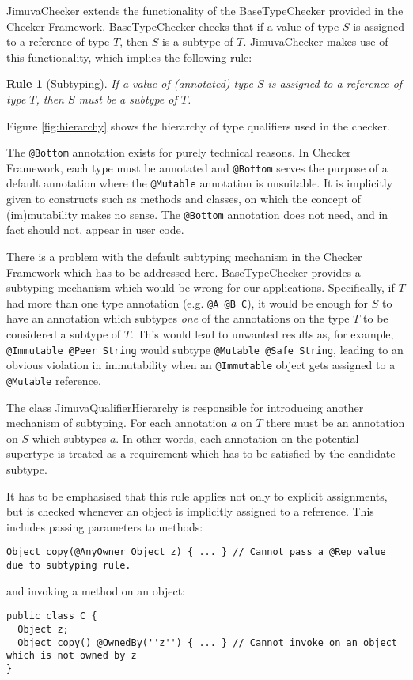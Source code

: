 \documentclass{pracamgr}
\theoremstyle{all}
\newtheorem{verrule}{Rule}
\begin{document}
JimuvaChecker extends the functionality of the BaseTypeChecker
provided in the Checker Framework. BaseTypeChecker checks that if a
value of type $S$ is assigned to a reference of type $T$, then $S$ is
a subtype of $T$. JimuvaChecker makes use of this functionality, which
implies the following rule:

\setcounter{verrule}{-1}
\begin{verrule}[Subtyping]
  If a value of (annotated) type $S$ is assigned to a reference of type $T$, 
  then $S$ must be a subtype of $T$.
\end{verrule}
Figure \ref{fig:hierarchy} shows the hierarchy of type qualifiers used
in the checker. 

The \texttt{@Bottom} annotation exists for purely technical
reasons. In Checker Framework, each type must be annotated and
\texttt{@Bottom} serves the purpose of a default annotation where the
\texttt{@Mutable} annotation is unsuitable. It is implicitly given to
constructs such as methods and classes, on which the concept of
(im)mutability makes no sense. The \texttt{@Bottom} annotation does
not need, and in fact should not, appear in user code. 

There is a problem with the default subtyping mechanism in the Checker
Framework which has to be addressed here. BaseTypeChecker provides a
subtyping mechanism which would be wrong for our
applications. Specifically, if $T$ had more than one type annotation
(e.g. \texttt{@A @B C}), it would be enough for $S$ to have an
annotation which subtypes \emph{one} of the annotations on the type
$T$ to be considered a subtype of $T$. This would lead to unwanted
results as, for example, \texttt{@Immutable @Peer String} would
subtype \texttt{@Mutable @Safe String}, leading to an obvious
violation in immutability when an \texttt{@Immutable} object gets
assigned to a \texttt{@Mutable} reference. 

The class JimuvaQualifierHierarchy is responsible for introducing
another mechanism of subtyping. For each annotation $a$ on $T$ there
must be an annotation on $S$ which subtypes $a$. In other words, each
annotation on the potential supertype is treated as a requirement
which has to be satisfied by the candidate subtype. 

It has to be emphasised that this rule applies not only to explicit
assignments, but is checked whenever an object is implicitly assigned
to a reference. This includes passing parameters to methods:
\begin{lstlisting}
Object copy(@AnyOwner Object z) { ... } // Cannot pass a @Rep value due to subtyping rule.
\end{lstlisting}
and invoking a method on an object: 
\begin{lstlisting}
public class C {
  Object z;
  Object copy() @OwnedBy(''z'') { ... } // Cannot invoke on an object which is not owned by z
}
\end{lstlisting}
\end{document}
